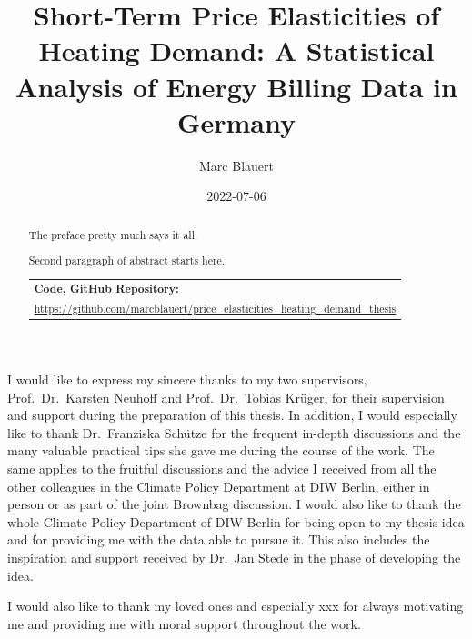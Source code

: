 \documentclass[12pt,twoside]{reedthesis}
\title{Short-Term Price Elasticities of Heating Demand: A Statistical Analysis of Energy Billing Data in Germany}
\author{Marc Blauert}
\date{2022-07-06}
\begin{document}
  \maketitle

\frontmatter %
\pagestyle{empty} %
  \begin{acknowledgements}
    I would like to express my sincere thanks to my two supervisors, Prof.~Dr.~Karsten Neuhoff and Prof.~Dr.~Tobias Krüger, for their supervision and support during the preparation of this thesis. In addition, I would especially like to thank Dr.~Franziska Schütze for the frequent in-depth discussions and the many valuable practical tips she gave me during the course of the work. The same applies to the fruitful discussions and the advice I received from all the other colleagues in the Climate Policy Department at DIW Berlin, either in person or as part of the joint Brownbag discussion. I would also like to thank the whole Climate Policy Department of DIW Berlin for being open to my thesis idea and for providing me with the data able to pursue it. This also includes the inspiration and support received by Dr.~Jan Stede in the phase of developing the idea.

    \par
    \bigskip

    I would also like to thank my loved ones and especially xxx for always motivating me and providing me with moral support throughout the work.
  \end{acknowledgements}

  \hypersetup{linkcolor=black}
  \setcounter{secnumdepth}{2}
  \setcounter{tocdepth}{2}
  \tableofcontents

  \listoftables

  \listoffigures
  \begin{abstract}
    The preface pretty much says it all.

    \par

    Second paragraph of abstract starts here.

    \bigskip \bigskip \noindent
    \begin{tabular}{m{14cm}} \hline \textbf{Code, GitHub Repository:} \\ \footnotesize \url{https://github.com/marcblauert/price_elasticities_heating_demand_thesis}  \\ \hline \end{tabular}
  \end{abstract}
\end{document}
